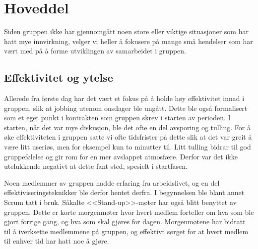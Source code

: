 
\chapter{Hoveddel} %

\label{ch:hoveddel} %




Siden gruppen ikke har gjennomgått noen store eller viktige situasjoner som har hatt mye innvirkning, velger vi heller å fokusere på mange små hendelser som har vært med på å forme utviklingen av samarbeidet i gruppen.


\section{Effektivitet og ytelse}


Allerede fra første dag har det vært et fokus på å holde høy effektivitet innad i gruppen, slik at jobbing utenom onsdager ble ungått. Dette ble også formalisert som et eget punkt i kontrakten som gruppen skrev i starten av perioden. I starten, når det var mye diskusjon, ble det ofte en del avsporing og tulling. For å øke effektiviteten i gruppen satte vi ofte tidsfrister på dette slik at det var greit å være litt useriøs, men for eksempel kun to minutter til. Litt tulling bidrar til god gruppefølelse og gir rom for en mer avslappet atmosfære. Derfor var det ikke utelukkende negativt at dette fant sted, spesielt i startfasen. 

Noen medlemmer av gruppen hadde erfaring fra arbeidslivet, og en del effektiviseringsteknikker ble derfor hentet derfra. I begynnelsen ble blant annet Scrum tatt i bruk. Såkalte <<Stand-up>>-møter har også blitt benyttet av gruppen. Dette er korte morgenmøter hvor hvert medlem forteller om hva som ble gjort forrige gang, og hva som skal gjøres for dagen. Morgenmøtene har bidratt til å iverksette medlemmene på gruppen, og effektivt sørget for at hvert medlem til enhver tid har hatt noe å gjøre.

